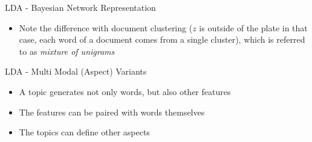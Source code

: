 \documentclass[pdf]{beamer}
\begin{document}
\begin{frame}{LDA - Bayesian Network Representation}
	\begin{itemize}
		\item Note the difference with document clustering ($z$ is outside of the plate in that case, each word of a document comes from a single cluster), which is referred to as \textit{mixture of unigrams}
	\end{itemize}
\end{frame}

\begin{frame}{LDA - Multi Modal (Aspect) Variants}
	\begin{itemize}
		\item A topic generates not only words, but also other features
		\item The features can be paired with words themselves
		\item The topics can define other aspects
	\end{itemize}
\end{frame}
\end{document}

